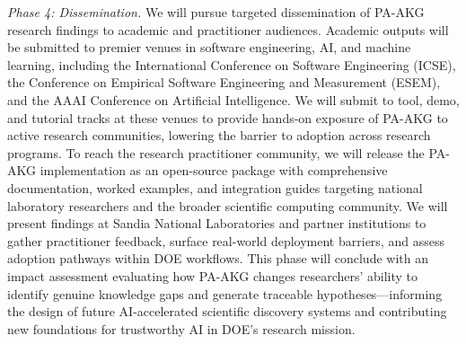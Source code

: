 \documentclass{files/proposalnsf}
\begin{document}
\textit{Phase 4: Dissemination.}
We will pursue targeted dissemination of PA-AKG research findings to academic and practitioner audiences. Academic outputs will be submitted to premier venues in software engineering, AI, and machine learning, including the International Conference on Software Engineering (ICSE), the Conference on Empirical Software Engineering and Measurement (ESEM), and the AAAI Conference on Artificial Intelligence. We will submit to tool, demo, and tutorial tracks at these venues to provide hands-on exposure of PA-AKG to active research communities, lowering the barrier to adoption across research programs. To reach the research practitioner community, we will release the PA-AKG implementation as an open-source package with comprehensive documentation, worked examples, and integration guides targeting national laboratory researchers and the broader scientific computing community. We will present findings at Sandia National Laboratories and partner institutions to gather practitioner feedback, surface real-world deployment barriers, and assess adoption pathways within DOE workflows. This phase will conclude with an impact assessment evaluating how PA-AKG changes researchers' ability to identify genuine knowledge gaps and generate traceable hypotheses---informing the design of future AI-accelerated scientific discovery systems and contributing new foundations for trustworthy AI in DOE's research mission. 

\end{document}
